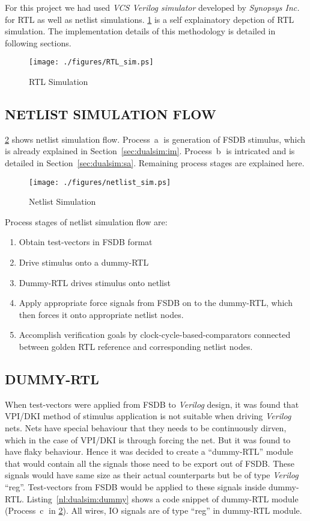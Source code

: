 For this project we had used {\it VCS Verilog simulator} developed by {\it Synopsys Inc.} for RTL as well as netlist simulations. \figurename{\ref{fig:RTL_sim.eps}} is a self explainatory depction of RTL simulation. The implementation details of this methodology is detailed in following sections. 

\begin{figure}[h]
\centering
\texttt{[image: ./figures/RTL\_sim.ps]}
\caption{RTL Simulation}
\label{fig:RTL_sim.eps}
\end{figure}


\subsection{NETLIST SIMULATION FLOW}
\figurename {\ref{fig:netlist_sim.ps}} shows netlist simulation flow. Process~\textcircled{a} is generation of FSDB stimulus, which is already explained in Section~\ref{sec:dualsim:im}. Process~\textcircled{b} is intricated and is detailed in Section~\ref{sec:dualsim:sa}. Remaining process stages are explained here.

\begin{figure}[h]
\centering
\texttt{[image: ./figures/netlist\_sim.ps]}
\caption{Netlist Simulation}
\label{fig:netlist_sim.ps}
\end{figure}

Process stages of netlist simulation flow are:
\begin{enumerate}
	\item Obtain test-vectors in FSDB format
	\item Drive stimulus onto a dummy-RTL
	\item Dummy-RTL drives stimulus onto netlist
	\item Apply appropriate force signals from FSDB on to the dummy-RTL, which then forces it onto appropriate netlist nodes.
	\item Accomplish verification goals by clock-cycle-based-comparators connected between golden RTL reference and corresponding netlist nodes.
\end{enumerate}

\subsection{DUMMY-RTL}
When test-vectors were applied from FSDB to {\it Verilog} design, it was found that VPI/DKI method of stimulus application is not suitable when driving {\it Verilog} nets. Nets have special behaviour that they needs to be continuously dirven, which in the case of VPI/DKI is through forcing the net. But it was found to have flaky behaviour. Hence it was decided to create a ``dummy-RTL'' module that would contain all the signals those need to be export out of FSDB. These signals would have same size as their actual counterparts but be of type {\it Verilog} ``reg''. Test-vectors from FSDB would be applied to these signals inside dummy-RTL. Listing~\ref{nl:dualsim:dummy} shows a code snippet of dummy-RTL module (Process~\textcircled{c} in \figurename {\ref{fig:netlist_sim.ps}}). All wires, IO signals are of type ``reg'' in dummy-RTL module.

